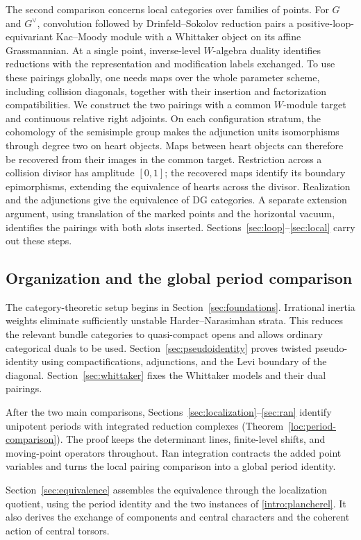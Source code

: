 The second comparison concerns local categories over families of points.
For $G$ and $G^\vee$, convolution followed by Drinfeld--Sokolov
reduction pairs a positive-loop-equivariant Kac--Moody module with a
Whittaker object on its affine Grassmannian. At a single point,
inverse-level $W$-algebra duality identifies reductions with the
representation and modification labels exchanged. To use these pairings
globally, one needs maps over the
whole parameter scheme, including collision diagonals, together with
their insertion and factorization compatibilities. We construct the two
pairings with a common $W$-module target and continuous relative right
adjoints. On each configuration stratum, the cohomology of the
semisimple group makes the adjunction units isomorphisms through degree
two on heart objects. Maps between heart objects can therefore be
recovered from their images in the common target. Restriction across a
collision divisor has amplitude $[0,1]$; the recovered maps identify its
boundary epimorphisms, extending the equivalence of hearts across the
divisor. Realization and the adjunctions give the equivalence of DG
categories. A separate extension argument, using translation of the
marked points and the horizontal vacuum, identifies the pairings with
both slots inserted. Sections~\ref{sec:loop}--\ref{sec:local} carry out
these steps.

\subsection{Organization and the global period comparison}

The category-theoretic setup begins in Section~\ref{sec:foundations}.
Irrational inertia weights eliminate sufficiently unstable
Harder--Narasimhan strata. This reduces the relevant bundle categories
to quasi-compact opens and allows ordinary categorical duals to be used.
Section~\ref{sec:pseudoidentity} proves twisted pseudo-identity using
compactifications, adjunctions, and the Levi boundary of the diagonal.
Section~\ref{sec:whittaker} fixes the Whittaker models and their dual
pairings.

After the two main comparisons, Sections~\ref{sec:localization}--\ref{sec:ran}
identify unipotent periods with integrated reduction complexes
(Theorem~\ref{loc:period-comparison}). The
proof keeps the determinant lines, finite-level shifts, and moving-point
operators throughout. Ran integration contracts the added point
variables and turns the local pairing comparison into a global period
identity.

Section~\ref{sec:equivalence} assembles the equivalence through the
localization quotient, using the period identity and the two instances
of \eqref{intro:plancherel}. It also derives the exchange of components
and central characters and the coherent action of central torsors.

